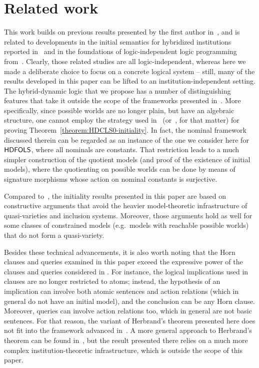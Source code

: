 \documentclass[a4paper,UKenglish,cleveref,autoref]{lipics-v2019}
\begin{document}

\section{Related work}
\label{section:related-work}

This work builds on previous results presented by the first author in~\cite{Gaina17Her}, and is related to developments in the initial semantics for hybridized institutions reported in~\cite{Diaconescu16} and in the foundations of logic-independent logic programming from~\cite{Diaconescu04,TutuF15,TutuF17}.
Clearly, those related studies are all logic-independent, whereas here we made a deliberate choice to focus on a concrete logical system -- still, many of the results developed in this paper can be lifted to an institution-independent setting.
The hybrid-dynamic logic that we propose has a number of distinguishing features that take it outside the scope of the frameworks presented in~\cite{Gaina17Her,Diaconescu16,Diaconescu04}.
More specifically, since possible worlds are no longer plain, but have an algebraic structure, one cannot employ the strategy used in~\cite{Gaina17Her} (or~\cite{Diaconescu16}, for that matter) for proving Theorem~\ref{theorem:HDCLS0-initiality}.
In fact, the nominal framework discussed therein can be regarded as an instance of the one we consider here for \({\mathsf{HDFOLS}}\), where all nominals are constants.
That restriction leads to a much simpler construction of the quotient models (and proof of the existence of initial models), where the quotienting on possible worlds can be done by means of signature morphisms whose action on nominal constants is surjective.

Compared to~\cite{Diaconescu16}, the initiality results presented in this paper are based on constructive arguments that avoid the heavier model-theoretic infrastructure of quasi-varieties and inclusion systems.
Moreover, those arguments hold as well for some classes of constrained models (e.g.\ models with reachable possible worlds) that do not form a quasi-variety.

Besides these technical advancements, it is also worth noting that the Horn clauses and queries examined in this paper exceed the expressive power of the clauses and queries considered in \cite{Gaina17Her}.
For instance, the logical implications used in clauses are no longer restricted to atoms; instead, the hypothesis of an implication can involve both atomic sentences and action relations (which in general do not have an initial model), and the conclusion can be any Horn clause.
Moreover, queries can involve action relations too, which in general are not basic sentences.
For that reason, the variant of Herbrand's theorem presented here does not fit into the framework advanced in~\cite{Diaconescu04}.
A more general approach to Herbrand's theorem can be found in~\cite{TutuF17}, but the result presented there relies on a much more complex institution-theoretic infrastructure, which is outside the scope of this paper.
\end{document}
